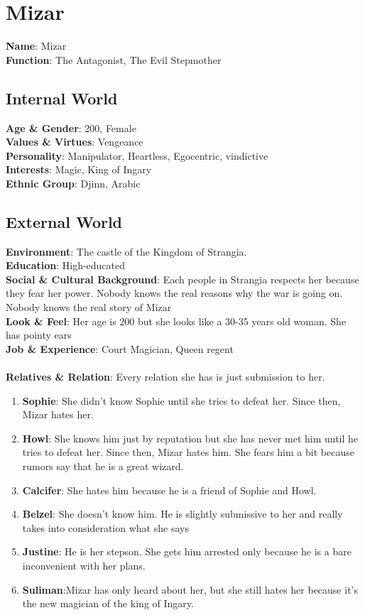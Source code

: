 \section{Mizar}

\textbf{Name}: Mizar\\
\textbf{Function}: The Antagonist, The Evil Stepmother

\subsection{Internal World}

\textbf{Age \& Gender}: 200, Female \\
\textbf{Values \& Virtues}: Vengeance \\
\textbf{Personality}: Manipulator, Heartless, Egocentric, vindictive \\
\textbf{Interests}: Magic, King of Ingary \\
\textbf{Ethnic Group}: Djinn, Arabic

\subsection{External World}
\textbf{Environment}: The castle of the Kingdom of Strangia. \\
\textbf{Education}: High-educated \\
\textbf{Social \& Cultural Background}: Each people in Strangia respects her because they fear her power. Nobody knows the real reasons why the war is going on. Nobody knows the real story of Mizar \\
\textbf{Look \& Feel}: Her age is 200 but she looks like a 30-35 years old woman. She has pointy ears  \\
\textbf{Job \& Experience}: Court Magician, Queen regent \\
\\
\textbf{Relatives \& Relation}: Every relation she has is just submission to her.
\begin{enumerate}
\item \textbf{Sophie}: She didn’t know Sophie until she tries to defeat her. Since then, Mizar hates her.
\item \textbf{Howl}: She knows him just by reputation but she has never met him until he tries to defeat her. Since then, Mizar hates him. She fears him a bit because rumors say that he is a great wizard.
\item \textbf{Calcifer}: She hates him because he is a friend of Sophie and Howl.
\item \textbf{Belzel}: She doesn’t know him.
             He is slightly submissive to her and really takes into consideration what she says
\item \textbf{Justine}: He is her stepson. She gets him arrested only because he is a bare  inconvenient with her plans. 
\item \textbf{Suliman}:Mizar has only heard about her, but she still hates her because it’s the new magician of the king of Ingary.
\end{enumerate}

